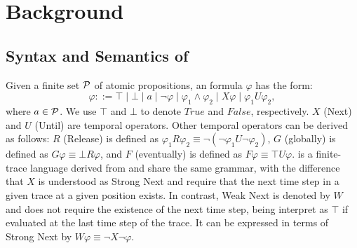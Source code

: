 \section{Background}

\subsection{Syntax and Semantics of \ltlf}
\label{sec:ltlf}

Given a finite set ${\mathcal{P}}$ of atomic propositions, an \ltl formula $\varphi$ has the form:
\[
    \varphi ::= \top \mid
    \bot
    \mid 
    a
    \mid
    \lnot\varphi
    \mid
    \varphi_1\land\varphi_2
    \mid
    X\varphi
    \mid
    \varphi_1 U\varphi_2,
\]
where $a \in {\ensuremath{\mathcal{P}}}$. We use $\top$ and $\bot$ to denote $True$ and $False$, respectively. $X$ (Next) and $U$ (Until) are temporal operators. Other temporal operators can be derived as follows: $R$ (Release) is defined as $\varphi_1 R \varphi_2 \equiv \neg(\neg\varphi_1 U \neg\varphi_2 )$, $G$ (globally) is defined as $G\varphi \equiv \bot R\varphi$, and $F$ (eventually) is defined as $F \varphi \equiv \top U \varphi$.
%
\ltlf is a finite-trace language derived from \ltl and share the same grammar, with the difference that $X$ is understood as Strong Next and require that the next time step in a given trace at a given position exists. In contrast, Weak Next is denoted by $W$ and does not require the existence of the next time step, being interpret as $\top$ if evaluated at the last time step of the trace. It can be expressed in terms of Strong Next by $W \varphi \equiv \neg X\neg\varphi$. 

